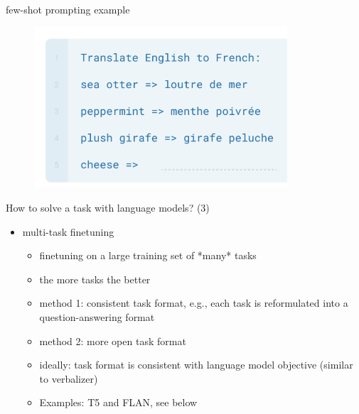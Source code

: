 \begin{frame}{few-shot prompting example}

\vfill
	
	\begin{figure}
		\centering
		\includegraphics[height = 6cm]{figure/fewshotprompting} 
	\end{figure}

\vfill

\end{frame}


\begin{frame}{How to solve a task with language models? (3)}

\vfill

\begin{itemize}
\item multi-task finetuning
        \begin{itemize}
        \item finetuning on a large training set of *many* tasks
        \item the more tasks the better
        \item method 1: consistent task format, e.g., each
        task is reformulated into a question-answering format
        \item method 2: more open task format
\item ideally: task format is
consistent with language model
            objective (similar to verbalizer)
            \item Examples: T5 and FLAN, see below
        \end{itemize}
\end{itemize}

\vfill

\end{frame}

